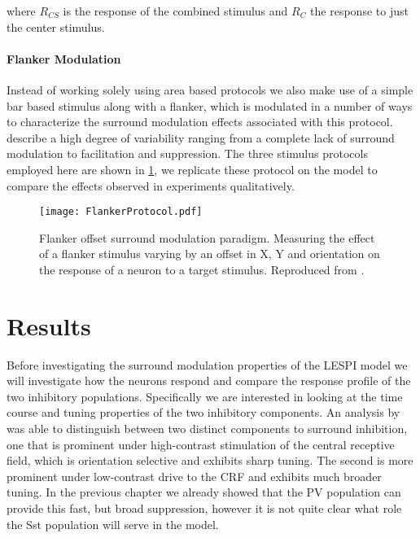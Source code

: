 where $R_{CS}$ is the response of the combined stimulus and $R_C$ the
response to just the center stimulus.

\paragraph{Flanker Modulation}

Instead of working solely using area based protocols we also make use
of a simple bar based stimulus along with a flanker, which is
modulated in a number of ways to characterize the surround modulation
effects associated with this protocol. \cite{Kapadia1995} describe
a high degree of variability ranging from a complete lack of surround
modulation to facilitation and suppression. The three stimulus
protocols employed here are shown in \ref{Flanker}, we replicate these
protocol on the model to compare the effects observed in experiments
qualitatively.

\begin{figure}
	\centering
        \texttt{[image: FlankerProtocol.pdf]}
	\caption[Flanker offset stimuli. Reproduced from
      \cite{Kapadia1995}.]{Flanker offset surround modulation
      paradigm. Measuring the effect of a flanker stimulus varying by
      an offset in X, Y and orientation on the response of a neuron to
      a target stimulus. Reproduced from \cite{Kapadia1995}.}
	\label{Flanker}
\end{figure}

\section{Results}

Before investigating the surround modulation properties of the LESPI
model we will investigate how the neurons respond and compare the
response profile of the two inhibitory populations. Specifically we
are interested in looking at the time course and tuning properties of
the two inhibitory components. An analysis by \cite{Webb2005} was able
to distinguish between two distinct components to surround inhibition,
one that is prominent under high-contrast stimulation of the central
receptive field, which is orientation selective and exhibits sharp
tuning. The second is more prominent under low-contrast drive to the
CRF and exhibits much broader tuning. In the previous chapter we
already showed that the PV population can provide this fast, but broad
suppression, however it is not quite clear what role the Sst
population will serve in the model.


